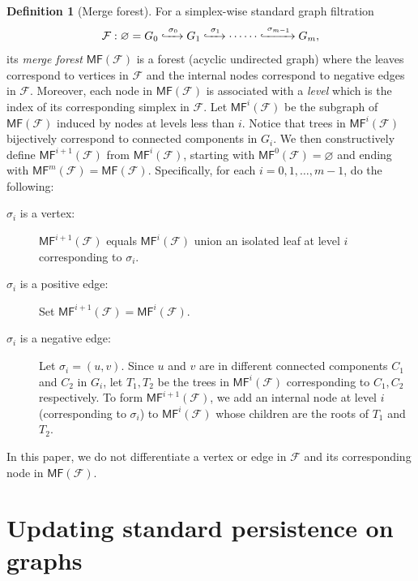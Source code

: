 \documentclass[letterpaper,11pt]{article}
\theoremstyle{mythmstyle}
\theoremstyle{mydefstyle}
\newtheorem{definition}{Definition}
\theoremstyle{plain}
\theoremstyle{definition}
\newtheorem{definition}[theorem]{Definition}
\newcommand{\<}[1]{\langle #1\rangle}
\newcommand{\lbarrowspace}{\;}
\newcommand{\inctosp}[1]{\xhookrightarrow{\lbarrowspace#1\lbarrowspace}}
\newcommand{\MF}{\mathsf{MF}}
\let\emptyset\varnothing
\newcommand{\Fcal}{\mathcal{F}}
\newcommand{\sG}{\sigma}
\newcommand{\filtcnt}{m}
\newcommand{\defemph}[1]{\emph{#1}}
\theoremstyle{definition}
\begin{document}
\begin{definition}[Merge forest]\label{dfn:MF}
For a simplex-wise standard graph filtration
\[\Fcal:\emptyset= G_0 \inctosp{\sG_0}
G_1 \inctosp{\sG_1}
\cdots
\cdots \inctosp{\sG_{\filtcnt-1}} G_\filtcnt,\]
its \defemph{merge forest}
$\MF(\Fcal)$
is a forest (acyclic undirected graph) where the leaves correspond to vertices in $\Fcal$
and the internal nodes correspond to negative edges  in $\Fcal$.
Moreover, each node in $\MF(\Fcal)$ is associated with a \defemph{level} which is the   index
of its corresponding simplex in $\Fcal$.
Let $\MF^i(\Fcal)$ be the subgraph of $\MF(\Fcal)$ induced by nodes
at levels less than $i$.
Notice that trees in $\MF^i(\Fcal)$ bijectively correspond
to connected components in $G_{i}$.
We then constructively define $\MF^{i+1}(\Fcal)$ from $\MF^{i}(\Fcal)$,
starting with $\MF^{0}(\Fcal)=\emptyset$
and ending with $\MF^{\filtcnt}(\Fcal)=\MF(\Fcal)$.
Specifically, for each $i=0,1,\ldots,\filtcnt-1$, do the following:
\begin{description}
    \item[$\sG_{i}$ is a vertex:]
    $\MF^{i+1}(\Fcal)$ equals $\MF^{i}(\Fcal)$ union an isolated leaf at level $i$
    corresponding to $\sG_i$.
    \item[$\sG_{i}$ is a positive edge:]
    Set $\MF^{i+1}(\Fcal)=\MF^{i}(\Fcal)$.
    \item[$\sG_{i}$ is a negative edge:]
    Let $\sG_i=(u,v)$. Since $u$ and $v$ are in different connected components $C_1$ and $C_2$ in $G_i$,  
    let $T_1,T_2$ be the trees in $\MF^{i}(\Fcal)$
    corresponding to $C_1,C_2$ respectively.
    To form $\MF^{i+1}(\Fcal)$, we add an internal node at level $i$ (corresponding to $\sG_i$) to $\MF^{i}(\Fcal)$ 
    whose children are the roots of $T_1$ and $T_2$.
\end{description}
\end{definition}

In this paper, we do not differentiate a vertex or edge in $\Fcal$
and its corresponding node in $\MF(\Fcal)$.



\section{Updating standard persistence on graphs}
\label{sec:std-switch}
\end{document}
